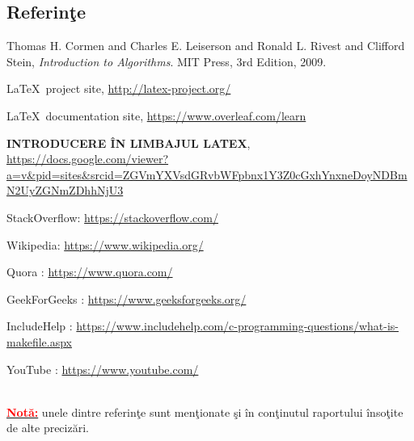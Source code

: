 \documentclass[14pt]{article}
\begin{document}
\subsection{Referin\c te}

\begin{thebibliography}{10}

	 Thomas H. Cormen and Charles E. Leiserson and Ronald L. Rivest and Clifford Stein,
	  \emph{Introduction to Algorithms}.
	  MIT Press,
	  3rd Edition,
	  2009.
	
     \LaTeX~project site,
     \textcolor{blue}{\url{http://latex-project.org/}}
     
       \LaTeX~documentation site,
     \textcolor{blue}{\url{https://www.overleaf.com/learn}}
     
     \textbf{INTRODUCERE \^IN LIMBAJUL LATEX},
      \textcolor{blue}{\url{https://docs.google.com/viewer?a=v&pid=sites&srcid=ZGVmYXVsdGRvbWFpbnx1Y3Z0cGxhYnxneDoyNDBmN2UyZGNmZDhhNjU3}}

StackOverflow: \textcolor{blue}{\url{https://stackoverflow.com/}}

Wikipedia: \textcolor{blue}{\url{https://www.wikipedia.org/}}

Quora : \textcolor{blue}{\url{https://www.quora.com/}}

GeekForGeeks : \textcolor{blue}{\url{https://www.geeksforgeeks.org/}} 

IncludeHelp :\textcolor{blue}{ \url{https://www.includehelp.com/c-programming-questions/what-is-makefile.aspx}}

YouTube : \textcolor{blue}{\url{https://www.youtube.com/}}
\end{thebibliography}
\\


\underline{\textbf{\textcolor{red}{Not\u{a}:}}} unele dintre referin\c te sunt men\c tionate \c si \^in con\c tinutul raportului \^inso\c tite de alte preciz\u{a}ri.
\end{document}
